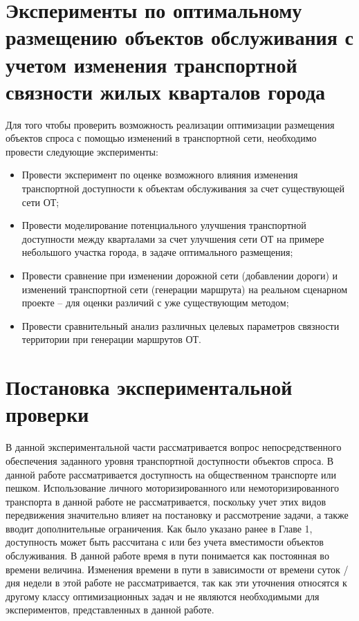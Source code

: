 \section{Эксперименты по оптимальному размещению объектов обслуживания с учетом изменения транспортной связности жилых кварталов города}
\label{sec:network-optimization-experiment}


Для того чтобы проверить возможность реализации оптимизации размещения объектов спроса с помощью изменений в транспортной сети, необходимо провести следующие эксперименты:

\begin{itemize}
    \item Провести эксперимент по оценке возможного влияния изменения транспортной доступности к объектам обслуживания за счет существующей сети ОТ;
    \item Провести моделирование потенциального улучшения транспортной доступности между кварталами за счет улучшения сети ОТ на примере небольшого участка города, в задаче оптимального размещения;
    \item Провести сравнение при изменении дорожной сети (добавлении дороги) и изменений транспортной сети (генерации маршрута) на реальном сценарном проекте -- для оценки различий с уже существующим методом;
    \item Провести сравнительный анализ различных целевых параметров связности территории при генерации маршрутов ОТ.
\end{itemize}

\section{Постановка экспериментальной проверки}
\label{sec:placement-experiment-setup}

В данной экспериментальной части рассматривается вопрос непосредственного обеспечения заданного уровня транспортной доступности объектов спроса. В данной работе рассматривается доступность на общественном транспорте или пешком. Использование личного моторизированного или немоторизированного транспорта в данной работе не рассматривается, поскольку учет этих видов передвижения значительно влияет на постановку и рассмотрение задачи, а также вводит дополнительные ограничения. Как было указано ранее в Главе 1, доступность может быть рассчитана с или без учета вместимости объектов обслуживания. В данной работе время в пути понимается как постоянная во времени величина. Изменения времени в пути в зависимости от времени суток / дня недели в этой работе не рассматривается, так как эти уточнения относятся к другому классу оптимизационных задач и не являются необходимыми для экспериментов, представленных в данной работе.

